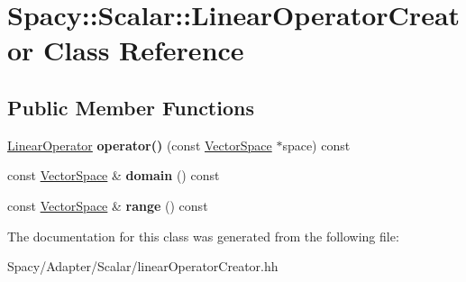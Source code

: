 \hypertarget{classSpacy_1_1Scalar_1_1LinearOperatorCreator}{}\section{Spacy\+:\+:Scalar\+:\+:Linear\+Operator\+Creator Class Reference}
\label{classSpacy_1_1Scalar_1_1LinearOperatorCreator}
\subsection*{Public Member Functions}
\begin{DoxyCompactItemize}
\item 
\hypertarget{classSpacy_1_1Scalar_1_1LinearOperatorCreator_ac6dfc55efe19059448b54dd67ab8c9ce}{}\hyperlink{structSpacy_1_1Scalar_1_1LinearOperator}{Linear\+Operator} {\bfseries operator()} (const \hyperlink{classSpacy_1_1VectorSpace}{Vector\+Space} $\ast$space) const \label{classSpacy_1_1Scalar_1_1LinearOperatorCreator_ac6dfc55efe19059448b54dd67ab8c9ce}

\item 
\hypertarget{classSpacy_1_1Scalar_1_1LinearOperatorCreator_a4485d5a4718ec8211eae5c74090b1331}{}const \hyperlink{classSpacy_1_1VectorSpace}{Vector\+Space} \& {\bfseries domain} () const \label{classSpacy_1_1Scalar_1_1LinearOperatorCreator_a4485d5a4718ec8211eae5c74090b1331}

\item 
\hypertarget{classSpacy_1_1Scalar_1_1LinearOperatorCreator_adcd36576ce3d569e0e4709f8433cc372}{}const \hyperlink{classSpacy_1_1VectorSpace}{Vector\+Space} \& {\bfseries range} () const \label{classSpacy_1_1Scalar_1_1LinearOperatorCreator_adcd36576ce3d569e0e4709f8433cc372}

\end{DoxyCompactItemize}


The documentation for this class was generated from the following file\+:\begin{DoxyCompactItemize}
\item 
Spacy/\+Adapter/\+Scalar/linear\+Operator\+Creator.\+hh\end{DoxyCompactItemize}
